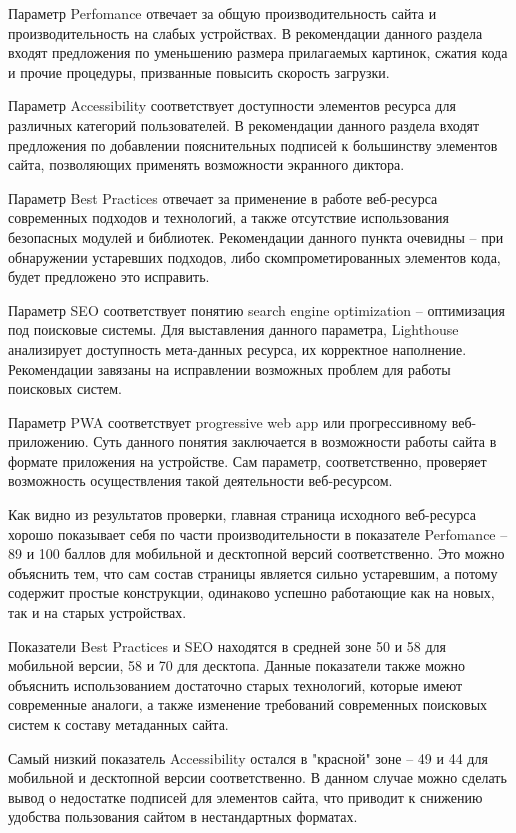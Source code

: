 Параметр Perfomance отвечает за общую производительность сайта и производительность на слабых устройствах.
В рекомендации данного раздела входят предложения по уменьшению размера прилагаемых картинок, сжатия кода и прочие процедуры, призванные повысить скорость загрузки.

Параметр Accessibility соответствует доступности элементов ресурса для различных категорий пользователей.
В рекомендации данного раздела входят предложения по добавлении пояснительных подписей к большинству элементов сайта, позволяющих применять возможности экранного диктора.

Параметр Best Practices отвечает за применение в работе веб-ресурса современных подходов и технологий, а также отсутствие использования безопасных модулей и библиотек.
Рекомендации данного пункта очевидны -- при обнаружении устаревших подходов, либо скомпрометированных элементов кода, будет предложено это исправить.

Параметр SEO соответствует понятию search engine optimization -- оптимизация под поисковые системы.
Для выставления данного параметра, Lighthouse анализирует доступность мета-данных ресурса, их корректное наполнение.
Рекомендации завязаны на исправлении возможных проблем для работы поисковых систем.

Параметр PWA соответствует progressive web app или прогрессивному веб-приложению.
Суть данного понятия заключается в возможности работы сайта в формате приложения на устройстве.
Сам параметр, соответственно, проверяет возможность осуществления такой деятельности веб-ресурсом.

Как видно из результатов проверки, главная страница исходного веб-ресурса хорошо показывает себя по части производительности в показателе Perfomance -- 89 и 100 баллов для мобильной и десктопной версий соответственно.
Это можно объяснить тем, что сам состав страницы является сильно устаревшим, а потому содержит простые конструкции, одинаково успешно работающие как на новых, так и на старых устройствах.

Показатели Best Practices и SEO находятся в средней зоне 50 и 58 для мобильной версии, 58 и 70 для десктопа.
Данные показатели также можно объяснить использованием достаточно старых технологий, которые имеют современные аналоги, а также изменение требований современных поисковых систем к составу метаданных сайта.

Самый низкий показатель Accessibility остался в "красной" зоне -- 49 и 44 для мобильной и десктопной версии соответственно.
В данном случае можно сделать вывод о недостатке подписей для элементов сайта, что приводит к снижению удобства пользования сайтом в нестандартных форматах.

